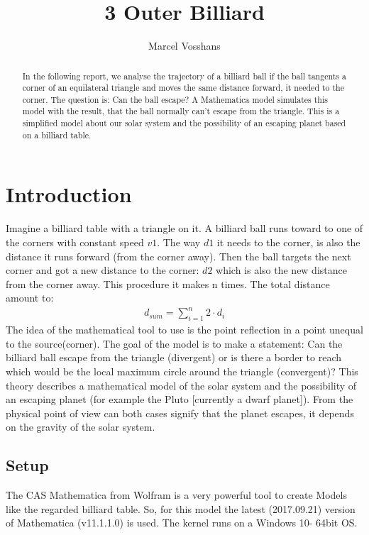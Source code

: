 \documentclass[11pt,a4paper]{article}
\begin{document}
\title{3 Outer Billiard}
\author{Marcel Vosshans}
\maketitle

\begin{abstract}
In the following report, we analyse the trajectory of a billiard ball if the ball tangents a corner of an equilateral triangle and moves the same distance forward, it needed to the corner. The question is: Can the ball escape? A Mathematica model simulates this model with the result, that the ball normally can’t escape from the triangle. This is a simplified model about our solar system and the possibility of an escaping planet based on a billiard table.
\end{abstract}

\tableofcontents

\section{Introduction}
Imagine a billiard table with a triangle on it. A billiard ball runs toward to one of the corners with constant speed \(v1\). The way \(d1\) it needs to the corner, is also the distance it runs forward (from the corner away). Then the ball targets the next corner and got a new distance to the corner: \(d2\) which is also the new distance from the corner away. This procedure it makes n times. The total distance amount to:
\begin{align}
d_{sum}= \sum \limits_{i=1}^n 2 \cdot d_i
\end{align}
The idea of the mathematical tool to use is the point reflection in a point unequal to the source(corner). The goal of the model is to make a statement: Can the billiard ball escape from the triangle (divergent) or is there a border to reach which would be the local maximum circle around the triangle (convergent)? This theory describes a mathematical model of the solar system and the possibility of an escaping planet (for example the Pluto [currently a dwarf planet]). From the physical point of view can both cases signify that the planet escapes, it depends on the gravity of the solar system.
 \subsection{Setup}
The CAS Mathematica from Wolfram is a very powerful tool to create Models like the regarded billiard table. So, for this model the latest (2017.09.21) version of Mathematica (v11.1.1.0) is used. The kernel runs on a Windows 10- 64bit OS.
\end{document}
